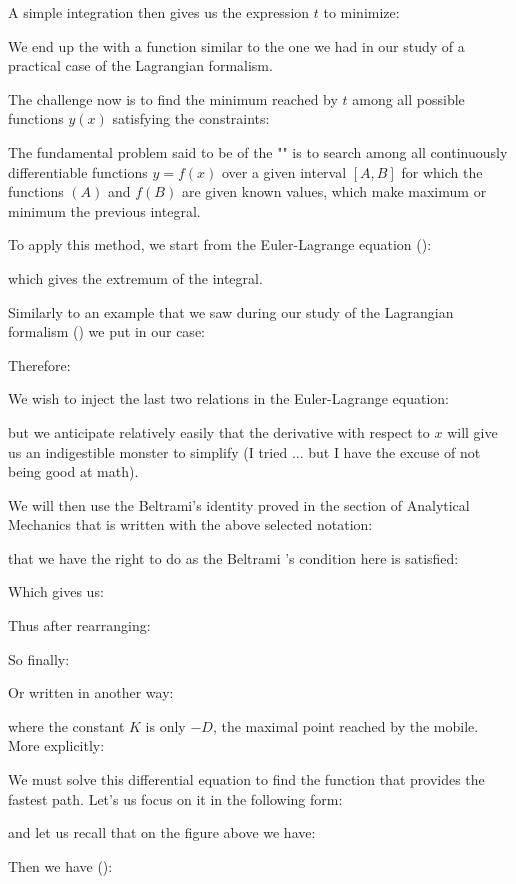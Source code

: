 	A simple integration then gives us the expression $t$ to minimize:
	
	We end up the with a function similar to the one we had in our study of a practical case of the Lagrangian formalism.

	The challenge now is to find the minimum reached by $t$ among all possible functions $y(x)$ satisfying the constraints:
	
	The fundamental problem said to be of the "" is to search among all continuously differentiable functions $y=f(x)$ over a given interval $[A, B]$ for which the functions $(A)$ and $f(B)$ are given known values, which make maximum or minimum the previous integral.

	To apply this method, we start from the Euler-Lagrange equation ():
	
	which gives the extremum of the integral.

	Similarly to an example that we saw during our study of the Lagrangian formalism () we put in our case:
	
	Therefore:
	
	We wish to inject the last two relations in the Euler-Lagrange equation:
	
	but we anticipate relatively easily that the derivative with respect to $x$ will give us an indigestible monster to simplify (I tried ... but I have the excuse of not being good at math).

	We will then use the Beltrami's identity proved in the section of Analytical Mechanics that is written with the above selected notation:
	
	that we have the right to do as the Beltrami 's condition here is satisfied:
	
	Which gives us:
	
	Thus after rearranging:
	
	So finally:
	
	Or written in another way:
	
	where the constant $K$ is only $-D$, the maximal point reached by the mobile. More explicitly:
	
	We must solve this differential equation to find the function that provides the fastest path. Let's us focus on it in the following form:
	
	and let us recall that on the figure above we have:
	
	Then we have ():
	
